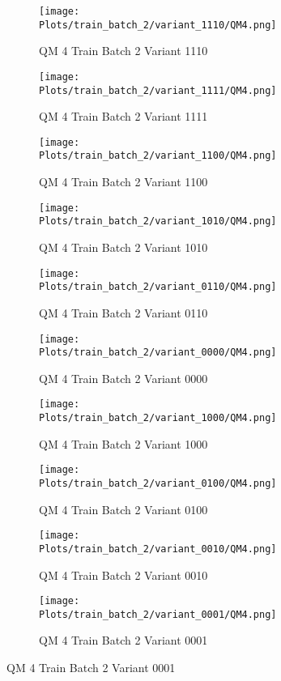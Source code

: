 \documentclass{DissertateFigs}
\begin{document}
\begin{figure}[t!]
    \begin{subfigure}{0.47\textwidth}
    \texttt{[image: Plots/train\_batch\_2/variant\_1110/QM4.png]}
    \caption{QM 4 Train Batch 2 Variant 1110}
    \end{subfigure}
    \begin{subfigure}{0.47\textwidth}
    \texttt{[image: Plots/train\_batch\_2/variant\_1111/QM4.png]}
    \caption{QM 4 Train Batch 2 Variant 1111}
    \end{subfigure}

\medskip

    \begin{subfigure}{0.47\textwidth}
    \texttt{[image: Plots/train\_batch\_2/variant\_1100/QM4.png]}
    \caption{QM 4 Train Batch 2 Variant 1100}
    \end{subfigure}
    \begin{subfigure}{0.47\textwidth}
    \texttt{[image: Plots/train\_batch\_2/variant\_1010/QM4.png]}
    \caption{QM 4 Train Batch 2 Variant 1010}
    \end{subfigure}

\medskip

    \begin{subfigure}{0.47\textwidth}
    \texttt{[image: Plots/train\_batch\_2/variant\_0110/QM4.png]}
    \caption{QM 4 Train Batch 2 Variant 0110}
    \end{subfigure}
    \begin{subfigure}{0.47\textwidth}
    \texttt{[image: Plots/train\_batch\_2/variant\_0000/QM4.png]}
    \caption{QM 4 Train Batch 2 Variant 0000}
    \end{subfigure}

\medskip

    \begin{subfigure}{0.47\textwidth}
    \texttt{[image: Plots/train\_batch\_2/variant\_1000/QM4.png]}
    \caption{QM 4 Train Batch 2 Variant 1000}
    \end{subfigure}
    \begin{subfigure}{0.47\textwidth}
    \texttt{[image: Plots/train\_batch\_2/variant\_0100/QM4.png]}
    \caption{QM 4 Train Batch 2 Variant 0100}
    \end{subfigure}

\medskip

    \begin{subfigure}{0.47\textwidth}
    \texttt{[image: Plots/train\_batch\_2/variant\_0010/QM4.png]}
    \caption{QM 4 Train Batch 2 Variant 0010}
    \end{subfigure}
    \begin{subfigure}{0.47\textwidth}
    \texttt{[image: Plots/train\_batch\_2/variant\_0001/QM4.png]}
    \caption{QM 4 Train Batch 2 Variant 0001}
    \end{subfigure}


\end{figure}
\end{document}
